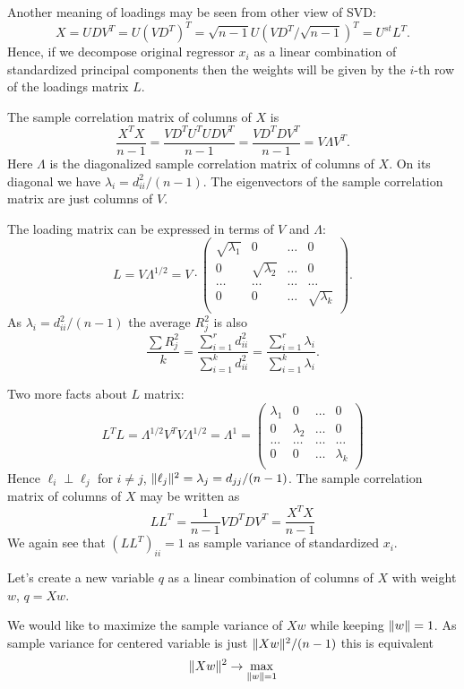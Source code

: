 \documentclass[12pt]{article}
\DeclarePairedDelimiter{\norm}{\lVert}{\rVert}
\begin{document}
Another meaning of loadings may be seen from other view of SVD:
\[
X = U D V^T = U (VD^T)^T = \sqrt{n - 1}U (VD^T / \sqrt{n - 1})^T = U^{st} L^T.
\]
Hence, if we decompose original regressor $x_i$ as a linear combination of standardized 
principal components then the weights will be given by the $i$-th row of the loadings matrix $L$.


The sample correlation matrix of columns of $X$ is
\[
\frac{X^T X}{n-1} = \frac{V D^T U^T UDV^T}{n - 1} = \frac{V D^T D V^T}{ n - 1} = V \Lambda V^T.
\]
Here $\Lambda$ is the diagonalized sample correlation matrix of columns of $X$.
On its diagonal we have $\lambda_i = d_{ii}^2 / (n - 1)$.
The eigenvectors of the sample correlation matrix are just columns of $V$. 

The loading matrix can be expressed in terms of $V$ and $\Lambda$:
\[
L = V \Lambda^{1/2} = V \cdot \begin{pmatrix}
    \sqrt{\lambda_1 } & 0 & \dots & 0 \\
    0  & \sqrt{\lambda_2} & \dots & 0 \\
    \dots & \dots & \dots & \dots \\
    0 & 0 & \dots & \sqrt{\lambda_k} \\
\end{pmatrix}.
\]
As $\lambda_i = d_{ii}^2 / (n-1)$ the average $R^2_j$ is also 
\[
\frac{\sum R_j^2}{k} =  \frac{\sum_{i=1}^r d_{ii}^2}{\sum_{i=1}^k d_{ii}^2} =  \frac{\sum_{i=1}^r \lambda_i}{\sum_{i=1}^k \lambda_i} .
\]

Two more facts about $L$ matrix:
\[
L^T L = \Lambda^{1/2} V^T V \Lambda^{1/2} = \Lambda^1 =  \begin{pmatrix}
    \lambda_1 & 0 & \dots & 0 \\
    0  & \lambda_2 & \dots & 0 \\
    \dots & \dots & \dots & \dots \\
    0 & 0 & \dots & \lambda_k \\
\end{pmatrix}
\]
Hence $\ell_i \perp \ell_j$ for $i \neq j$, $\norm{\ell_j}^2= \lambda_j = d_{jj} / (n - 1)$.
The sample correlation matrix of columns of $X$ may be written as
\[
LL^T = \frac{1}{n-1}V D^T D V^T = \frac{X^TX}{n - 1}
\]
We again see that $(LL^T)_{ii} = 1$ as sample variance of standardized $x_i$.

Let's create a new variable $q$ as a linear combination of columns of $X$ with weight $w$, $q = Xw$.

We would like to maximize the sample variance of $Xw$ while keeping $\norm{w} = 1$.
As sample variance for centered variable is just $\norm{Xw}^2 / (n - 1)$
this is equivalent
\[
\norm{Xw}^2  \to \max_{\norm{w} = 1}
\]
\end{document}
